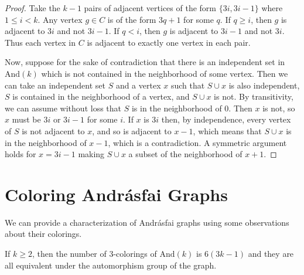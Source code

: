 \begin{proof}
	Take the $k-1$ pairs of adjacent vertices of the form $\{3i,3i-1\}$ where $1\leq i <k$.  Any vertex $g\in C$ is of the form $3q+1$ for some $q$.  If $q\geq i$, then $g$ is adjacent to $3i$ and not $3i-1$.  If $q<i$, then $g$ is adjacent to $3i-1$ and not $3i$.  Thus each vertex in $C$ is adjacent to exactly one vertex in each pair.
	
	Now, suppose for the sake of contradiction that there is an independent set in $\mathrm{And}(k)$ which is not contained in the neighborhood of some vertex.  Then we can take an independent set $S$ and a vertex $x$ such that $S\cup x$ is also independent, $S$ is contained in the neighborhood of a vertex, and $S\cup x$ is not.  By transitivity, we can assume without loss that $S$ is in the neighborhood of 0.  Then $x$ is not, so $x$ must be $3i$ or $3i-1$ for some $i$.  If $x$ is $3i$ then, by independence, every vertex of $S$ is not adjacent to $x$, and so is adjacent to $x-1$, which means that $S\cup x$ is in the neighborhood of $x-1$, which is a contradiction.  A symmetric argument holds for $x=3i-1$ making $S\cup x$ a subset of the neighborhood of $x+1$.
\end{proof}


\section*{Coloring Andr\'asfai Graphs}


We can provide a characterization of Andr\'asfai graphs using some observations about their colorings.  

\begin{lemma}
	If $k\geq 2$, then the number of 3-colorings of $\mathrm{And}(k)$ is $6(3k-1)$ and they are all equivalent under the automorphism group of the graph.
\end{lemma}

